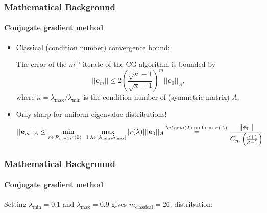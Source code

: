 \begin{frame}[label=background,fragile]
    \frametitle{Mathematical Background}
    \framesubtitle{Conjugate gradient method}
    \begin{itemize}
        \item<1-> Classical (condition number) convergence bound:
        \begin{theorem}
            The error of the $m^{\text{th}}$ iterate of the CG algorithm is bounded by
            \begin{equation*}
            ||\mathbf{e}_m|| \leq 2 \left(\frac{\sqrt{\kappa}-1}{\sqrt{\kappa} + 1}\right)^m ||\mathbf{e}_0||_A,
            \end{equation*}
            where $\kappa = \lambda_{\text{max}}/\lambda_{\text{min}}$ is the condition number of (symmetric matrix) $A$.
        \end{theorem}
        \item<2-> Only sharp for \alert<2>{uniform} eigenvalue distributions!
        \begin{equation*}
            ||\mathbf{e}_m||_A \leq \min_{r \in \mathcal{P}_{m-1}, r(0) = 1} \max_{\lambda \in [\lambda_{\text{min}}, \lambda_{\text{max}}]} |r(\lambda)| ||\mathbf{e}_0||_A \overset{\alert<2>{\text{uniform } \sigma(A)}}{=} \frac{\|\mathbf{e}_0\|}{C_m\left(\frac{\kappa + 1}{\kappa - 1}\right)}
        \end{equation*}
    \end{itemize}
\end{frame}

\begin{frame}[label=background,fragile]
    \frametitle{Mathematical Background}
    \framesubtitle{Conjugate gradient method}
    Setting $\lambda_{\text{min}} = 0.1$ and $\lambda_{\text{max}} = 0.9$ gives $m_{\text{classical}} = 26$.  distribution:
\end{frame}


